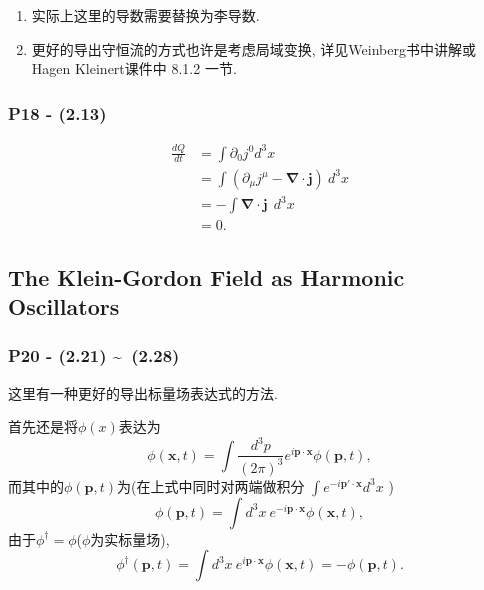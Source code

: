 \documentclass[cn,hazy,blue,11pt,device=normal,chinesefont=founder]{elegantnote}
\begin{document}
\begin{note}
  \mbox{}
  \begin{enumerate}
    \item 实际上这里的导数需要替换为李导数. 
    \item 更好的导出守恒流的方式也许是考虑局域变换, 详见Weinberg书中讲解或Hagen Kleinert课件中 8.1.2 一节. 
  \end{enumerate}
\end{note}

\subsubsection{P18 - (2.13)}
\begin{equation}
  \begin{aligned}
  \frac{dQ}{dt} &= \int \partial_0 j^0 d^3 x \\
  &= \int (\partial_\mu j^\mu - \boldsymbol{\nabla}\cdot\mathbf{j}) \ d^3 x \\
  & = - \int \boldsymbol{\nabla}\cdot\mathbf{j}\ \ d^3 x \\
  &=0.
  \end{aligned}
\end{equation}

\subsection{The Klein-Gordon Field as Harmonic Oscillators} 

\subsubsection{P20 - (2.21) \textasciitilde \ (2.28)} \label{subsubsec:KG_Field_expression}

这里有一种更好的导出标量场表达式的方法. 

首先还是将$\phi(x)$表达为
\begin{equation}
  \phi(\mathbf{x}, t) = \int \frac{d^3 p}{(2\pi)^3}e^{i\mathbf{p \cdot x}}\phi(\mathbf{p}, t), 
\end{equation}
而其中的$\phi(\mathbf{p}, t)$为(在上式中同时对两端做积分 $\int e^{-i\mathbf{p'\cdot x}} d^3 x$ )
\begin{equation}
  \phi(\mathbf{p}, t) = \int d^3 x\ e^{-i\mathbf{p \cdot x}}\phi(\mathbf{x}, t), 
\end{equation}
由于$\phi^\dagger = \phi$($\phi$为实标量场), 
\begin{equation}
  \phi^{\dagger}(\mathbf{p}, t) = \int d^3 x\ e^{i\mathbf{p \cdot x}}\phi(\mathbf{x}, t) = -\phi(\mathbf{p}, t). 
\end{equation}
\end{document}
